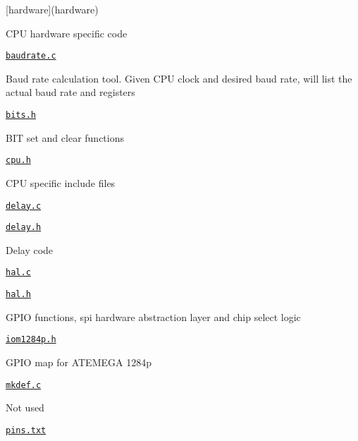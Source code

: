 \begin{DoxyItemize}
\item \mbox{[}hardware\mbox{]}(hardware)
\begin{DoxyItemize}
\item C\+PU hardware specific code
\item \href{hardware/baudrate.c}{\tt baudrate.\+c}
\begin{DoxyItemize}
\item Baud rate calculation tool. Given C\+PU clock and desired baud rate, will list the actual baud rate and registers
\end{DoxyItemize}
\item \href{hardware/bits.h}{\tt bits.\+h}
\begin{DoxyItemize}
\item B\+IT set and clear functions
\end{DoxyItemize}
\item \href{hardware/cpu.h}{\tt cpu.\+h}
\begin{DoxyItemize}
\item C\+PU specific include files
\end{DoxyItemize}
\item \href{hardware/delay.c}{\tt delay.\+c}
\item \href{hardware/delay.h}{\tt delay.\+h}
\begin{DoxyItemize}
\item Delay code
\end{DoxyItemize}
\item \href{hardware/hal.c}{\tt hal.\+c}
\item \href{hardware/hal.h}{\tt hal.\+h}
\begin{DoxyItemize}
\item G\+P\+IO functions, spi hardware abstraction layer and chip select logic
\end{DoxyItemize}
\item \href{hardware/iom1284p.h}{\tt iom1284p.\+h}
\begin{DoxyItemize}
\item G\+P\+IO map for A\+T\+E\+M\+E\+GA 1284p
\end{DoxyItemize}
\item \href{hardware/mkdef.c}{\tt mkdef.\+c}
\begin{DoxyItemize}
\item Not used
\end{DoxyItemize}
\item \href{hardware/pins.txt}{\tt pins.\+txt}
\begin{DoxyItemize}

\end{DoxyItemize}
\end{DoxyItemize}
\end{DoxyItemize}
